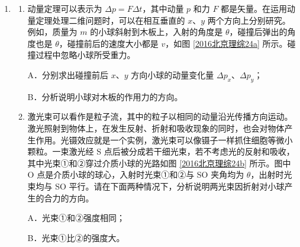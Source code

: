 \documentclass[\gkver]{gaokaozhenti}
\begin{document}
\begin{enumerate}
{（2）考虑电子所受重力和电场力的数量级，有
重力 $G=mg\sim10^{-29}\UN$，
电场力 $F=\frac{eU}{d}\sim10^{-15}\UN$，
由于 $F\gg G$，因此不需要考虑电子所受重力。

（3）电场中某点电势 $\varphi$ 定义为电荷在该点的电势能 $E_{p}$ 与其电荷量 $q$ 的比值，即
$\varphi=\frac{E_{p}}{q}$，
由于重力做功与路径无关，可以类比静电场电势的定义，将重力场中物体在某点的重力势能 $E_{G}$ 与其质量 $m$ 的比值，叫作“重力势”，即
$\varphi_{G}=\frac{E_{G}}{m}$，
电势 $\varphi$ 和重力势 $\varphi_{G}$ 都是反映场的能的性质的物理量，仅由场自身的因素决定。
}

\item
\begin{enumerate}
	\item
	动量定理可以表示为 $\Delta p=F\Delta t$，其中动量 $p$ 和力 $F$ 都是矢量。在运用动量定理处理二维问题时，可以在相互垂直的 $x$、$y$ 两个方向上分别研究。例如，质量为 $m$ 的小球斜射到木板上，入射的角度是 $\theta$，碰撞后弹出的角度也是 $\theta$，碰撞前后的速度大小都是 $v$，如图 \ref{2016北京理综24a} 所示。碰撞过程中忽略小球所受重力。

	A．分别求出碰撞前后 $x$、$y$ 方向小球的动量变化量 $\Delta p_{x}$、$\Delta p_{y}$；

	B．分析说明小球对木板的作用力的方向。

	\item
	激光束可以看作是粒子流，其中的粒子以相同的动量沿光传播方向运动。激光照射到物体上，在发生反射、折射和吸收现象的同时，也会对物体产生作用。光镊效应就是一个实例，激光束可以像镊子一样抓住细胞等微小颗粒。一束激光经 S 点后被分成若干细光束，若不考虑光的反射和吸收，其中光束①和②穿过介质小球的光路如图 \ref{2016北京理综24b} 所示。图中 O 点是介质小球的球心，入射时光束①和②与 SO 夹角均为 $\theta$，出射时光束均与 SO 平行。请在下面两种情况下，分析说明两光束因折射对小球产生的合力的方向。

	A．光束①和②强度相同；

	B．光束①比②的强度大。
\end{enumerate}
\end{enumerate}
\end{document}
